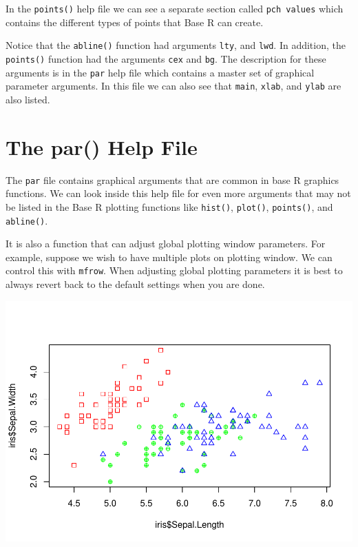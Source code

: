\documentclass[
]{book}
\newenvironment{Shaded}{\begin{snugshade}}{\end{snugshade}}
\newcommand{\CommentTok}[1]{\textcolor[rgb]{0.56,0.35,0.01}{\textit{#1}}}
\newcommand{\DataTypeTok}[1]{\textcolor[rgb]{0.13,0.29,0.53}{#1}}
\newcommand{\DecValTok}[1]{\textcolor[rgb]{0.00,0.00,0.81}{#1}}
\newcommand{\KeywordTok}[1]{\textcolor[rgb]{0.13,0.29,0.53}{\textbf{#1}}}
\newcommand{\NormalTok}[1]{#1}
\newcommand{\OperatorTok}[1]{\textcolor[rgb]{0.81,0.36,0.00}{\textbf{#1}}}
\begin{document}
In the \texttt{points()} help file we can see a separate section called \texttt{pch\ values} which contains the different types of points that Base R can create.

Notice that the \texttt{abline()} function had arguments \texttt{lty}, and \texttt{lwd}. In addition, the \texttt{points()} function had the arguments \texttt{cex} and \texttt{bg}. The description for these arguments is in the \texttt{par} help file which contains a master set of graphical parameter arguments. In this file we can also see that \texttt{main}, \texttt{xlab}, and \texttt{ylab} are also listed.

\hypertarget{the-par-help-file}{%
\section{The par() Help File}\label{the-par-help-file}}

The \texttt{par} file contains graphical arguments that are common in base R graphics functions. We can look inside this help file for even more arguments that may not be listed in the Base R plotting functions like \texttt{hist()}, \texttt{plot()}, \texttt{points()}, and \texttt{abline()}.

It is also a function that can adjust global plotting window parameters. For example, suppose we wish to have multiple plots on plotting window. We can control this with \texttt{mfrow}. When adjusting global plotting parameters it is best to always revert back to the default settings when you are done.

\begin{Shaded}
\end{Shaded}

\includegraphics{_main_files/figure-latex/unnamed-chunk-190-1.pdf}
\end{document}
